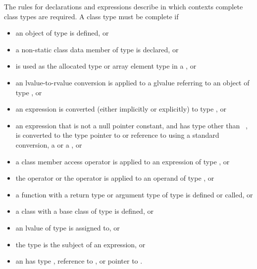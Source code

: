 \begin{note}
The rules for declarations and expressions
describe in which contexts complete class types are required. A class
type  must be complete if
\begin{itemize}
\item an object of type  is defined, or
\item a non-static class data member of type  is
declared, or
\item {} is used as the allocated type or array element type in a
, or
\item an lvalue-to-rvalue conversion is applied to
a glvalue referring
to an object of type , or
\item an expression is converted (either implicitly or explicitly) to
type , or
\item an expression that is not a null pointer constant, and has type
other than \cv{}~, is converted to the type pointer to 
or reference to  using a standard conversion,
a  or
a , or
\item a class member access operator is applied to an expression of type
, or
\item the  operator or the
 operator is applied to an operand of
type , or
\item a function with a return type or argument type of type 
is defined or called, or
\item a class with a base class of type  is
defined, or
\item an lvalue of type  is assigned to, or
\item the type  is the subject of an
 expression, or
\item an  has type , reference to
, or pointer to .
\end{itemize}
\end{note}

